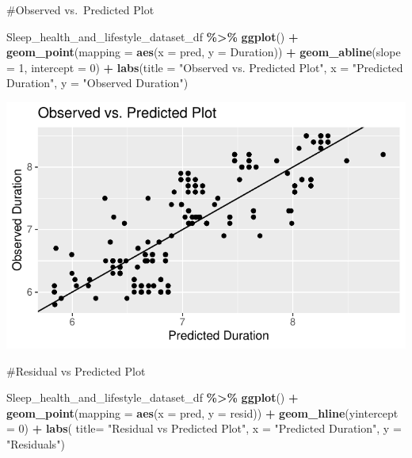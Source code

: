 \documentclass[
  11pt,
]{article}
\newenvironment{Shaded}{\begin{snugshade}}{\end{snugshade}}
\newcommand{\AttributeTok}[1]{\textcolor[rgb]{0.13,0.29,0.53}{#1}}
\newcommand{\DecValTok}[1]{\textcolor[rgb]{0.00,0.00,0.81}{#1}}
\newcommand{\FunctionTok}[1]{\textcolor[rgb]{0.13,0.29,0.53}{\textbf{#1}}}
\newcommand{\NormalTok}[1]{#1}
\newcommand{\SpecialCharTok}[1]{\textcolor[rgb]{0.81,0.36,0.00}{\textbf{#1}}}
\newcommand{\StringTok}[1]{\textcolor[rgb]{0.31,0.60,0.02}{#1}}
\begin{document}
\#Observed vs.~Predicted Plot

\begin{Shaded}
\begin{Highlighting}[]
\NormalTok{Sleep\_health\_and\_lifestyle\_dataset\_df }\SpecialCharTok{\%\textgreater{}\%}
  \FunctionTok{ggplot}\NormalTok{() }\SpecialCharTok{+}
  \FunctionTok{geom\_point}\NormalTok{(}\AttributeTok{mapping =} \FunctionTok{aes}\NormalTok{(}\AttributeTok{x =}\NormalTok{ pred, }\AttributeTok{y =}\NormalTok{ Duration)) }\SpecialCharTok{+}
  \FunctionTok{geom\_abline}\NormalTok{(}\AttributeTok{slope =} \DecValTok{1}\NormalTok{, }\AttributeTok{intercept =} \DecValTok{0}\NormalTok{) }\SpecialCharTok{+}
  \FunctionTok{labs}\NormalTok{(}\AttributeTok{title =} \StringTok{"Observed vs. Predicted Plot"}\NormalTok{, }\AttributeTok{x =} \StringTok{"Predicted Duration"}\NormalTok{, }\AttributeTok{y =} \StringTok{"Observed Duration"}\NormalTok{)}
\end{Highlighting}
\end{Shaded}

\begin{center}\includegraphics[width=0.7\linewidth]{SleepHelath_files/figure-latex/unnamed-chunk-59-1} \end{center}

\#Residual vs Predicted Plot

\begin{Shaded}
\begin{Highlighting}[]
\NormalTok{Sleep\_health\_and\_lifestyle\_dataset\_df }\SpecialCharTok{\%\textgreater{}\%}
  \FunctionTok{ggplot}\NormalTok{() }\SpecialCharTok{+}
  \FunctionTok{geom\_point}\NormalTok{(}\AttributeTok{mapping =} \FunctionTok{aes}\NormalTok{(}\AttributeTok{x =}\NormalTok{ pred, }\AttributeTok{y =}\NormalTok{ resid)) }\SpecialCharTok{+}
  \FunctionTok{geom\_hline}\NormalTok{(}\AttributeTok{yintercept =} \DecValTok{0}\NormalTok{) }\SpecialCharTok{+}
  \FunctionTok{labs}\NormalTok{( }\AttributeTok{title=} \StringTok{"Residual vs Predicted Plot"}\NormalTok{,}
        \AttributeTok{x =} \StringTok{"Predicted Duration"}\NormalTok{,}
        \AttributeTok{y =} \StringTok{"Residuals"}\NormalTok{)}
\end{Highlighting}
\end{Shaded}
\end{document}
